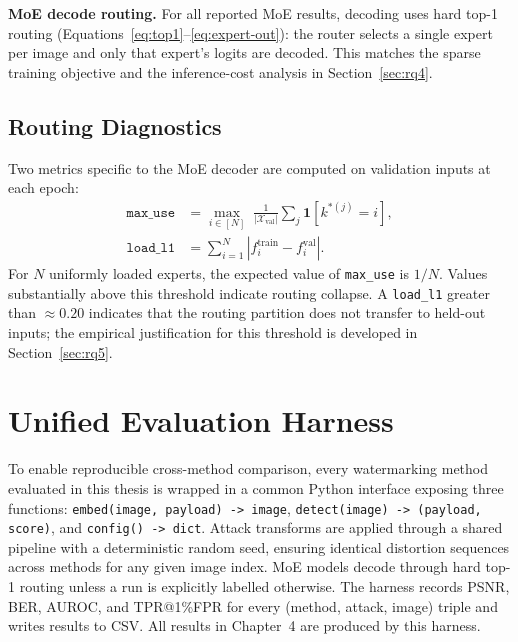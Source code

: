 ﻿\documentclass[12pt, a4paper, twoside]{report}
\numberwithin{equation}{chapter}
\begin{document}
\textbf{MoE decode routing.} For all reported MoE results, decoding uses hard top-1 routing (Equations~\eqref{eq:top1}--\eqref{eq:expert-out}): the router selects a single expert per image and only that expert's logits are decoded. This matches the sparse training objective and the inference-cost analysis in Section~\ref{sec:rq4}. 

\subsection*{Routing Diagnostics}

Two metrics specific to the MoE decoder are computed on validation inputs at each epoch:
\begin{align}
    \texttt{max\_use}  &= \max_{i\in[N]}\; \frac{1}{|\mathcal{X}_\mathrm{val}|}\sum_{j} \mathbf{1}\!\left[k^{*(j)}=i\right], \label{eq:maxuse}\\[4pt]
    \texttt{load\_l1} &= \sum_{i=1}^{N}\left|f_i^{\mathrm{train}} - f_i^{\mathrm{val}}\right|. \label{eq:loadl1}
\end{align}
For $N$ uniformly loaded experts, the expected value of \texttt{max\_use} is $1/N$. Values substantially above this threshold indicate routing collapse. A \texttt{load\_l1} greater than $\approx 0.20$ indicates that the routing partition does not transfer to held-out inputs; the empirical justification for this threshold is developed in Section~\ref{sec:rq5}.

\section{Unified Evaluation Harness}
\label{sec:harness}

To enable reproducible cross-method comparison, every watermarking method evaluated in this thesis is wrapped in a common Python interface exposing three functions: \texttt{embed(image, payload) -> image}, \texttt{detect(image) -> (payload, score)}, and \texttt{config() -> dict}. Attack transforms are applied through a shared pipeline with a deterministic random seed, ensuring identical distortion sequences across methods for any given image index. MoE models decode through hard top-1 routing unless a run is explicitly labelled otherwise. The harness records PSNR, BER, AUROC, and TPR@1\%FPR for every (method, attack, image) triple and writes results to CSV. All results in Chapter~4 are produced by this harness.

\end{document}
